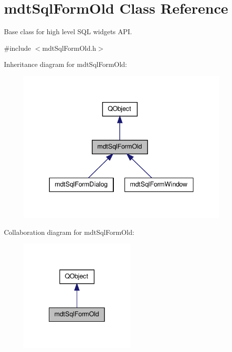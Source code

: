 \hypertarget{classmdt_sql_form_old}{\section{mdt\-Sql\-Form\-Old Class Reference}
\label{classmdt_sql_form_old}
}


Base class for high level S\-Q\-L widgets A\-P\-I.  




{\ttfamily \#include $<$mdt\-Sql\-Form\-Old.\-h$>$}



Inheritance diagram for mdt\-Sql\-Form\-Old\-:\nopagebreak
\begin{figure}[H]
\begin{center}
\leavevmode
\includegraphics[width=300pt]{classmdt_sql_form_old__inherit__graph}
\end{center}
\end{figure}


Collaboration diagram for mdt\-Sql\-Form\-Old\-:\nopagebreak
\begin{figure}[H]
\begin{center}
\leavevmode
\includegraphics[width=164pt]{classmdt_sql_form_old__coll__graph}
\end{center}
\end{figure}
